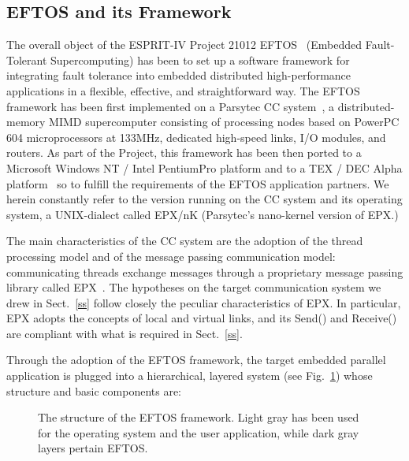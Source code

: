 \documentclass[11pt]{article}
\begin{document}
\subsection{EFTOS and its Framework}\label{ef}
The overall object of the ESPRIT-IV Project 21012 
EFTOS~\cite{DDLV97a,DVBD97} 
(Embedded Fault-Tolerant Supercomputing) has been to set up a software framework 
for integrating fault tolerance into embedded distributed high-performance
applications in a flexible, effective, and straightforward way. 
The EFTOS framework has been first implemented on a Parsytec 
CC system~\cite{Pars96a}, 
a distributed-memory MIMD supercomputer consisting of processing 
nodes based on PowerPC 604 microprocessors at 133MHz, 
dedicated high-speed links, I/O modules,
and routers. As part of the Project, this framework has been then
ported to a Microsoft Windows NT / Intel PentiumPro platform
and to a TEX / DEC Alpha platform~\cite{TEX,DEC}
so to fulfill the requirements of the EFTOS application partners.
We herein constantly refer to the version running on the CC system
and its operating system, a UNIX-dialect called EPX/nK (Parsytec's nano-kernel
version of EPX.)

The main characteristics of the CC system are the adoption of the 
thread processing model and of the message passing communication model: 
communicating threads exchange messages through a proprietary 
message passing library called EPX~\cite{Pars96b}.
The hypotheses on the target communication system we drew in Sect.~\ref{ss}
follow closely the peculiar characteristics of EPX. In particular,
EPX adopts the concepts of local and virtual links, and its {\sf Send()}
and {\sf Receive()} are compliant with what is required in Sect.~\ref{ss}.

Through the adoption of the EFTOS framework, the target embedded parallel 
application is plugged into a hierarchical, layered system 
(see Fig.~\ref{library}) whose structure and basic components are:
\begin{figure}
\centerline{}
\caption{The structure of the EFTOS framework. Light gray has been used
for the operating system and the user application, while dark gray layers
pertain EFTOS.}
\label{library}
\end{figure}
\end{document}
